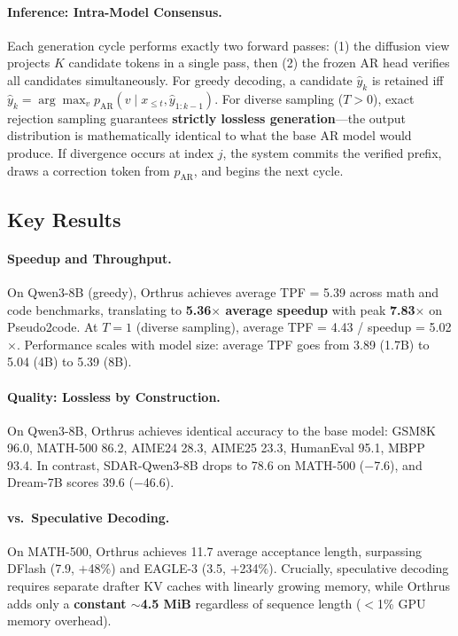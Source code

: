 \documentclass[11pt,a4paper]{article}
\begin{document}
\paragraph{Inference: Intra-Model Consensus.} Each generation cycle performs exactly two forward passes: (1) the diffusion view projects $K$ candidate tokens in a single pass, then (2) the frozen AR head verifies all candidates simultaneously. For greedy decoding, a candidate $\hat{y}_k$ is retained iff $\hat{y}_k = \arg\max_v p_{\mathrm{AR}}(v \mid x_{\leq t}, \hat{y}_{1:k-1})$. For diverse sampling ($T > 0$), exact rejection sampling guarantees \textbf{strictly lossless generation}---the output distribution is mathematically identical to what the base AR model would produce. If divergence occurs at index $j$, the system commits the verified prefix, draws a correction token from $p_{\mathrm{AR}}$, and begins the next cycle.

\subsection{Key Results}

\paragraph{Speedup and Throughput.} On Qwen3-8B (greedy), Orthrus achieves average TPF = 5.39 across math and code benchmarks, translating to \textbf{5.36$\times$ average speedup} with peak \textbf{7.83$\times$} on Pseudo2code. At $T{=}1$ (diverse sampling), average TPF = 4.43 / speedup = 5.02$\times$. Performance scales with model size: average TPF goes from 3.89 (1.7B) to 5.04 (4B) to 5.39 (8B).

\paragraph{Quality: Lossless by Construction.} On Qwen3-8B, Orthrus achieves identical accuracy to the base model: GSM8K 96.0, MATH-500 86.2, AIME24 28.3, AIME25 23.3, HumanEval 95.1, MBPP 93.4. In contrast, SDAR-Qwen3-8B drops to 78.6 on MATH-500 ($-$7.6), and Dream-7B scores 39.6 ($-$46.6).

\paragraph{vs.\ Speculative Decoding.} On MATH-500, Orthrus achieves 11.7 average acceptance length, surpassing DFlash (7.9, $+$48\%) and EAGLE-3 (3.5, $+$234\%). Crucially, speculative decoding requires separate drafter KV caches with linearly growing memory, while Orthrus adds only a \textbf{constant ${\sim}$4.5 MiB} regardless of sequence length ($<$1\% GPU memory overhead).
\end{document}
